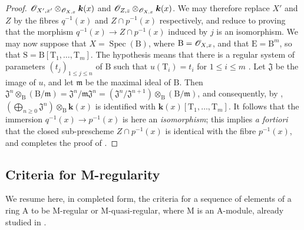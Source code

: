\begin{proof}
$\mathscr{O}_{X',x'}\otimes_{\mathscr{O}_{X,x}}\boldsymbol{k}(x)$ and
$\mathscr{O}_{Z,z}\otimes_{\mathscr{O}_{X,x}}\boldsymbol{k}(x)$.
We may therefore replace $X'$ and $Z$ by the fibres $q^{-1}(x)$ and $Z\cap p^{-1}(x)$ respectively, and reduce to proving that the morphism
$q^{-1}(x)\to Z\cap p^{-1}(x)$ induced by $j$ is an isomorphism.
We may now suppose that $X=\operatorname{Spec}(\mathrm{B})$, where $\mathrm{B}=\mathscr{O}_{X,x}$, and that $\mathrm{E}=\mathrm{B}^m$, so that $\mathrm{S}=\mathrm{B}[\mathrm{T}_1,\ldots,\mathrm{T}_m]$.
The hypothesis means that there is a regular system of parameters $(t_j)_{1\leq j\leq n}$ of $\mathrm{B}$ such that $u(\mathrm{T}_i)=t_i$ for $1\leq i\leq m$ .
Let $\mathfrak{J}$ be the image of $u$, and let $\mathfrak{m}$ be the maximal ideal of $\mathrm{B}$. Then $\mathfrak{J}^n\otimes_\mathrm{B}(\mathrm{B}/\mathfrak{m})
=\mathfrak{J}^n/\mathfrak{m}\mathfrak{J}^n
=(\mathfrak{J}^n/\mathfrak{J}^{n+1})\otimes_\mathrm{B}(\mathrm{B}/\mathfrak{m})$,
and consequently, by ,
$(\bigoplus_{n\geq0}\mathfrak{J}^n)\otimes_\mathrm{B}\boldsymbol{k}(x)$ is identified with
$\boldsymbol{k}(x)[\mathrm{T}_1,\ldots,\mathrm{T}_m]$.
It follows that the immersion $q^{-1}(x)\to p^{-1}(x)$ is here an \emph{isomorphism}; this implies \emph{a fortiori} that the closed sub-prescheme $Z\cap p^{-1}(x)$ is identical with the fibre $p^{-1}(x)$, and completes the proof of .
\end{proof}

\subsection{Criteria for M-regularity}
\label{subsection:IV.19.5}

We resume here, in completed form, the criteria for a sequence of elements of a ring $\mathrm{A}$ to be M-regular or M-quasi-regular, where $\mathrm{M}$ is an $\mathrm{A}$-module, already studied in .

